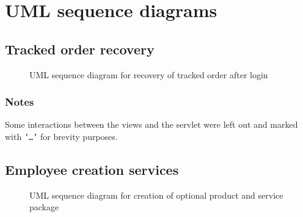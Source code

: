 
\chapter{UML sequence diagrams}
\label{chap:uml_diagrams}


\section{Tracked order recovery}
\label{sec:order_rec}

\begin{figure}[ht]
    \centering
    \centerline{}
    \caption{UML sequence diagram for recovery of tracked order after login}
    \label{fig:uml_1}
\end{figure}

\subsection*{Notes}

Some interactions between the views and the servlet were left out and marked with \texttt{'\dots'} for brevity purposes.

\section{Employee creation services}
\label{sec:emp_creation}

\begin{figure}[ht]
    \centering
    \centerline{}
    \caption{UML sequence diagram for creation of optional product and service package}
    \label{fig:uml_2}
\end{figure}
